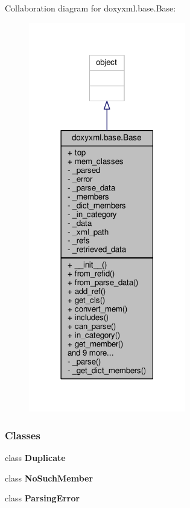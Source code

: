 Collaboration diagram for doxyxml.\+base.\+Base\+:
\nopagebreak
\begin{figure}[H]
\begin{center}
\leavevmode
\includegraphics[width=194pt]{d7/d47/classdoxyxml_1_1base_1_1Base__coll__graph}
\end{center}
\end{figure}
\subsubsection*{Classes}
\begin{DoxyCompactItemize}
\item 
class {\bf Duplicate}
\item 
class {\bf No\+Such\+Member}
\item 
class {\bf Parsing\+Error}
\end{DoxyCompactItemize}
